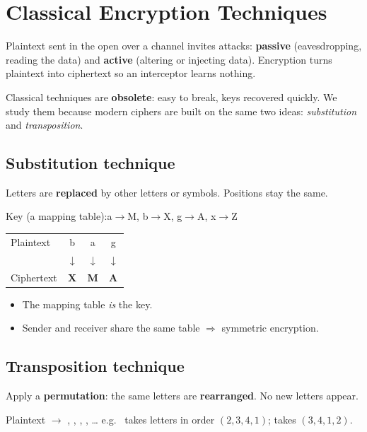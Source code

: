 \section{Classical Encryption Techniques}

Plaintext sent in the open over a channel invites attacks:
\textbf{passive} (eavesdropping, reading the data) and \textbf{active} (altering or injecting data).
Encryption turns plaintext into ciphertext so an interceptor learns nothing.

Classical techniques are \textbf{obsolete}: easy to break, keys recovered quickly. We study them because modern ciphers are built on the same two ideas: \emph{substitution} and \emph{transposition}.

\subsection{Substitution technique}
\begin{keybox}
Letters are \textbf{replaced} by other letters or symbols. Positions stay the same.
\end{keybox}
\begin{minipage}[t]{0.48\textwidth}
Key (a mapping table):\quad a$\to$M,\; b$\to$X,\; g$\to$A,\; x$\to$Z\\[3pt]
\begin{tabular}{@{}lccc@{}}
Plaintext  & b & a & g \\
           & $\downarrow$ & $\downarrow$ & $\downarrow$ \\
Ciphertext & \textbf{X} & \textbf{M} & \textbf{A}
\end{tabular}
\end{minipage}\hfill
\begin{minipage}[t]{0.48\textwidth}
\begin{itemize}
  \item The mapping table \emph{is} the key.
  \item Sender and receiver share the same table $\Rightarrow$ symmetric encryption.
\end{itemize}
\end{minipage}

\subsection{Transposition technique}
\begin{keybox}
Apply a \textbf{permutation}: the same letters are \textbf{rearranged}. No new letters appear.
\end{keybox}
Plaintext  $\to$ , , , , \dots
\quad e.g.\  takes letters in order $(2,3,4,1)$;  takes $(3,4,1,2)$.

